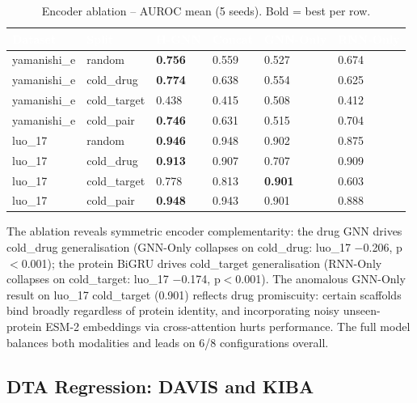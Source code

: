 \documentclass[12pt,a4paper,oneside]{report}
\newcommand{\sig}[1]{\textbf{#1}}
\begin{document}
\begin{table}[htbp]
\centering
\caption{Encoder ablation -- AUROC mean (5 seeds). Bold = best per row.}
\label{tab:ablation}
\begin{tabular}{@{}L{2cm}L{2cm}C{1.6cm}C{1.6cm}C{1.6cm}C{1.6cm}@{}}
\toprule
{}
\textcolor{white}{\textbf{Dataset}} &
\textcolor{white}{\textbf{Split}} &
\textcolor{white}{\textbf{H-GNN}} &
\textcolor{white}{\textbf{Concat}} &
\textcolor{white}{\textbf{GNN-Only}} &
\textcolor{white}{\textbf{RNN-Only}} \\
\midrule
{}
yamanishi\_e & random      & \sig{0.756} & 0.559 & 0.527 & 0.674 \\
yamanishi\_e & cold\_drug  & \sig{0.774} & 0.638 & 0.554 & 0.625 \\
yamanishi\_e & cold\_target& 0.438 & 0.415 & 0.508 & 0.412 \\
yamanishi\_e & cold\_pair  & \sig{0.746} & 0.631 & 0.515 & 0.704 \\
luo\_17 & random           & \sig{0.946} & 0.948 & 0.902 & 0.875 \\
luo\_17 & cold\_drug       & \sig{0.913} & 0.907 & 0.707 & 0.909 \\
luo\_17 & cold\_target     & 0.778 & 0.813 & \sig{0.901} & 0.603 \\
luo\_17 & cold\_pair       & \sig{0.948} & 0.943 & 0.901 & 0.888 \\
\bottomrule
\end{tabular}
\end{table}

The ablation reveals symmetric encoder complementarity: the drug GNN drives cold\_drug generalisation (GNN-Only collapses on cold\_drug: luo\_17 $-$0.206, p${<}$0.001); the protein BiGRU drives cold\_target generalisation (RNN-Only collapses on cold\_target: luo\_17 $-$0.174, p${<}$0.001). The anomalous GNN-Only result on luo\_17 cold\_target (0.901) reflects drug promiscuity: certain scaffolds bind broadly regardless of protein identity, and incorporating noisy unseen-protein ESM-2 embeddings via cross-attention hurts performance. The full model balances both modalities and leads on 6/8 configurations overall.

\subsection{DTA Regression: DAVIS and KIBA}
\end{document}
